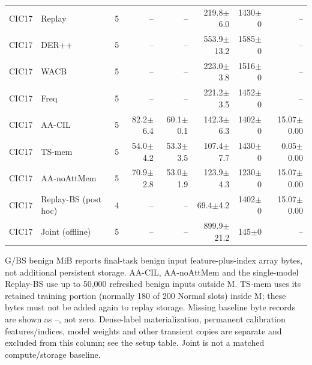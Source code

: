 \begin{table}[t]
\begin{tabular}{llrrrrrr}
CIC17 & Replay & 5 & -- & -- & 219.8$\pm$6.0 & 1430$\pm$0 & -- \\
CIC17 & DER++ & 5 & -- & -- & 553.9$\pm$13.2 & 1585$\pm$0 & -- \\
CIC17 & WACB & 5 & -- & -- & 223.0$\pm$3.8 & 1516$\pm$0 & -- \\
CIC17 & Freq & 5 & -- & -- & 221.2$\pm$3.5 & 1452$\pm$0 & -- \\
CIC17 & AA-CIL & 5 & 82.2$\pm$6.4 & 60.1$\pm$0.1 & 142.3$\pm$6.3 & 1402$\pm$0 & 15.07$\pm$0.00 \\
CIC17 & TS-mem & 5 & 54.0$\pm$4.2 & 53.3$\pm$3.5 & 107.4$\pm$7.7 & 1430$\pm$0 & 0.05$\pm$0.00 \\
CIC17 & AA-noAttMem & 5 & 70.9$\pm$2.8 & 53.0$\pm$1.9 & 123.9$\pm$4.3 & 1230$\pm$0 & 15.07$\pm$0.00 \\
CIC17 & Replay-BS (post hoc) & 4 & -- & -- & 69.4$\pm$4.2 & 1402$\pm$0 & 15.07$\pm$0.00 \\
CIC17 & Joint (offline) & 5 & -- & -- & 899.9$\pm$21.2 & 145$\pm$0 & -- \\
\bottomrule
\end{tabular}
\par\vspace{2pt}\begin{minipage}{.98\linewidth}\footnotesize G/BS benign MiB reports final-task benign input feature-plus-index array bytes, not additional persistent storage. AA-CIL, AA-noAttMem and the single-model Replay-BS use up to 50,000 refreshed benign inputs outside M. TS-mem uses its retained training portion (normally 180 of 200 Normal slots) inside M; these bytes must not be added again to replay storage. Missing baseline byte records are shown as --, not zero. Dense-label materialization, permanent calibration features/indices, model weights and other transient copies are separate and excluded from this column; see the setup table. Joint is not a matched compute/storage baseline.\end{minipage}
\end{table}
